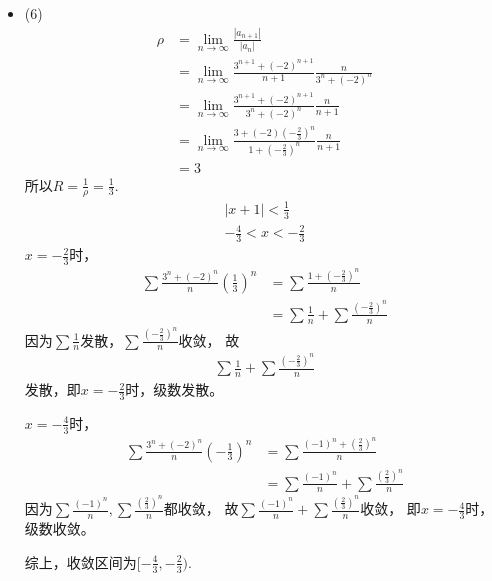\documentclass{article}
\begin{document}
\begin{itemize}
  \item (6)
        \begin{align*}
          \rho
           & = \lim\limits_{n \to \infty} \frac{|a_{n + 1}|}{|a_n|}                                               \\
           & = \lim\limits_{n \to \infty} \frac{3^{n+1} + (-2)^{n+1}}{n+1} \frac{n}{3^{n} + (-2)^{n}}             \\
           & = \lim\limits_{n \to \infty} \frac{3^{n+1} + (-2)^{n+1}}{3^{n} + (-2)^{n}} \frac{n}{n+1}             \\
           & = \lim\limits_{n \to \infty} \frac{3 + (-2)(-\frac{2}{3})^{n}}{1 + (-\frac{2}{3})^{n}} \frac{n}{n+1} \\
           & = 3
        \end{align*}
        所以$R = \frac{1}{\rho} = \frac{1}{3}$.
        \begin{align*}
          |x + 1| < \frac{1}{3} \\
          - \frac{4}{3} < x < - \frac{2}{3}
        \end{align*}
        $x = - \frac{2}{3}$时，
        \begin{align*}
          \sum \frac{3^n + (-2)^n}{n} (\frac{1}{3})^n
           & = \sum \frac{1 + (-\frac{2}{3})^n}{n}                \\
           & = \sum \frac{1}{n} + \sum \frac{(-\frac{2}{3})^n}{n}
        \end{align*}
        因为$\sum \frac{1}{n}$发散，$\sum \frac{(-\frac{2}{3})^n}{n}$收敛，
        故
        \begin{align*}
          \sum \frac{1}{n} + \sum \frac{(-\frac{2}{3})^n}{n}
        \end{align*}
        发散，即$x = - \frac{2}{3}$时，级数发散。

        $x = - \frac{4}{3}$时，
        \begin{align*}
          \sum \frac{3^n + (-2)^n}{n} (-\frac{1}{3})^n
           & = \sum \frac{(-1)^n + (\frac{2}{3})^n}{n}                \\
           & = \sum \frac{(-1)^n}{n} + \sum \frac{(\frac{2}{3})^n}{n}
        \end{align*}
        因为$\sum \frac{(-1)^n}{n}, \sum \frac{(\frac{2}{3})^n}{n}$都收敛，
        故$\sum \frac{(-1)^n}{n} + \sum \frac{(\frac{2}{3})^n}{n}$收敛，
        即$x = - \frac{4}{3}$时，级数收敛。

        综上，收敛区间为$[- \frac{4}{3}, - \frac{2}{3})$.


\end{itemize}
\end{document}
